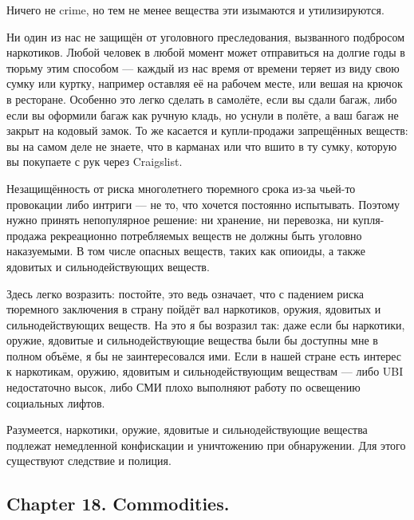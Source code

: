 \documentclass[11pt]{article}
\theoremstyle{remark}
\theoremstyle{definition}
\begin{document}
Ничего не crime, но тем не менее вещества эти изымаются и утилизируются.


Ни один из нас не защищён от уголовного преследования, вызванного подбросом наркотиков. Любой человек в любой момент может отправиться на долгие годы в тюрьму этим способом --- каждый из нас время от времени теряет из виду свою сумку или куртку, например оставляя её на рабочем месте, или вешая на крючок в ресторане. Особенно это легко сделать в самолёте, если вы сдали багаж, либо если вы оформили багаж как ручную кладь, но уснули в полёте, а ваш багаж не закрыт на кодовый замок. То же касается и купли-продажи запрещённых веществ: вы на самом деле не знаете, что в карманах или что вшито в ту сумку, которую вы покупаете с рук через Craigslist.

Незащищённость от риска многолетнего тюремного срока из-за чьей-то провокации либо интриги --- не то, что хочется постоянно испытывать. Поэтому нужно принять непопулярное решение: ни хранение, ни перевозка, ни купля-продажа рекреационно потребляемых веществ не должны быть уголовно наказуемыми. В том числе опасных веществ, таких как опиоиды, а также ядовитых и сильнодействующих веществ.

Здесь легко возразить: постойте, это ведь означает, что с падением риска тюремного заключения в страну пойдёт вал наркотиков, оружия, ядовитых и сильнодействующих веществ. На это я бы возразил так: даже если бы наркотики, оружие, ядовитые и сильнодействующие вещества были бы доступны мне в полном объёме, я бы не заинтересовался ими. Если в нашей стране есть интерес к наркотикам, оружию, ядовитым и сильнодействующим веществам --- либо UBI недостаточно высок, либо СМИ плохо выполняют работу по освещению социальных лифтов.

Разумеется, наркотики, оружие, ядовитые и сильнодействующие вещества подлежат немедленной конфискации и уничтожению при обнаружении. Для этого существуют следствие и полиция.



























\subsection*{Chapter 18. Commodities.}
\end{document}
